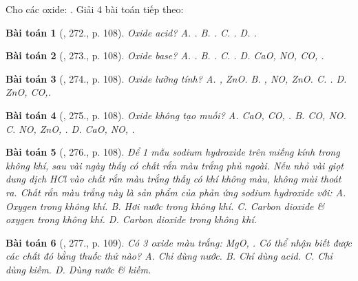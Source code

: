 \documentclass{article}
\newtheorem{baitoan}{Bài toán}
\begin{document}
Cho các oxide: . Giải 4 bài toán tiếp theo:

\begin{baitoan}[\cite{Nguyen_Buu_Can_500_BT_Hoa_Hoc_THCS}, 272., p. 108]
	Oxide acid? {\rm{\sf A.} . {\sf B.} . {\sf C.} . {\sf D.} .}
\end{baitoan}

\begin{baitoan}[\cite{Nguyen_Buu_Can_500_BT_Hoa_Hoc_THCS}, 273., p. 108]
	Oxide base? {\rm{\sf A.} . {\sf B.} . {\sf C.} . {\sf D.} CaO, NO, CO, .}
\end{baitoan}

\begin{baitoan}[\cite{Nguyen_Buu_Can_500_BT_Hoa_Hoc_THCS}, 274., p. 108]
	Oxide lưỡng tính? {\rm{\sf A.} , ZnO. {\sf B.} , NO, ZnO. {\sf C.} . {\sf D.} ZnO, CO,.}
\end{baitoan}

\begin{baitoan}[\cite{Nguyen_Buu_Can_500_BT_Hoa_Hoc_THCS}, 275., p. 108]
	Oxide không tạo muối? {\rm{\sf A.} CaO, CO, . {\sf B.} CO, NO. {\sf C.} NO, ZnO, . {\sf D.} CaO, NO, .}
\end{baitoan}

\begin{baitoan}[\cite{Nguyen_Buu_Can_500_BT_Hoa_Hoc_THCS}, 276., p. 108]
	Để 1 mẫu sodium hydroxide trên miếng kính trong không khí, sau vài ngày thấy có chất rắn màu trắng phủ ngoài. Nếu nhỏ vài giọt dung dịch {\rm HCl} vào chất rắn màu trắng thấy có khí không màu, không mùi thoát ra. Chất rắn màu trắng này là sản phẩm của phản ứng sodium hydroxide với: {\sf A.} Oxygen trong không khí. {\sf B.} Hơi nước trong không khí. {\sf C.} Carbon dioxide \& oxygen trong không khí. {\sf D.} Carbon dioxide trong không khí.
\end{baitoan}

\begin{baitoan}[\cite{Nguyen_Buu_Can_500_BT_Hoa_Hoc_THCS}, 277., p. 109]
	Có 3 oxide màu trắng: {\rm MgO, }. Có thể nhận biết được các chất đó bằng thuốc thử nào? {\sf A.} Chỉ dùng nước. {\sf B.} Chỉ dùng acid. {\sf C.} Chỉ dùng kiềm. {\sf D.} Dùng nước \& kiềm.
\end{baitoan}
\end{document}
